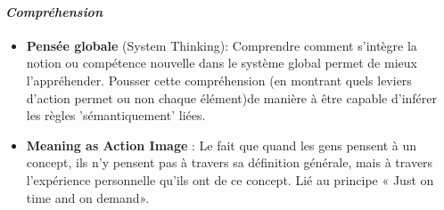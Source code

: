 			\paragraph{\emph{Compréhension}}
		\begin{itemize}
				\item {\textbf{Pensée globale} (System Thinking)}: Comprendre comment s'intègre la notion ou compétence nouvelle dans le système global permet de mieux l'appréhender. Pousser cette compréhension (en montrant quels leviers d'action permet ou non chaque élément)de manière à être capable d'inférer les règles 'sémantiquement' liées.
				\item {\textbf{Meaning as Action Image}} : Le fait que quand les gens pensent à un concept, ils n'y pensent pas à travers sa définition générale, mais à travers l'expérience personnelle qu'ils ont de ce concept. Lié au principe « Just on time and on demand».
		\end{itemize}	

